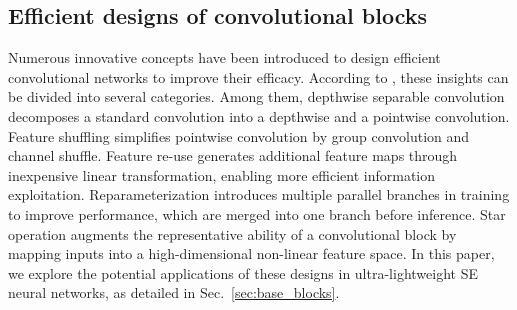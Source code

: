 \documentclass[journal]{IEEEtran}
\begin{document}
\subsection{Efficient designs of convolutional blocks}
\label{sec:efficient_convolution_design}
Numerous innovative concepts have been introduced to design efficient convolutional networks to improve their efficacy. According to \cite{StarNet}, these insights can be divided into several categories. Among them, depthwise separable convolution \cite{MobileNet, MobilenetV2, MobileNetV3} decomposes a standard convolution into a depthwise and a pointwise convolution. Feature shuffling \cite{ShuffleNet, ShuffleNetV2} simplifies pointwise convolution by group convolution and channel shuffle. Feature re-use \cite{GhostNet} generates additional feature maps through inexpensive linear transformation, enabling more efficient information exploitation. Reparameterization \cite{MobileOne} introduces multiple parallel branches in training to improve performance, which are merged into one branch before inference. Star operation \cite{StarNet} augments the representative ability of a convolutional block by mapping inputs into a high-dimensional non-linear feature space. 
In this paper, we explore the potential applications of these designs in ultra-lightweight SE neural networks, as detailed in Sec.~\ref{sec:base_blocks}.
\end{document}
